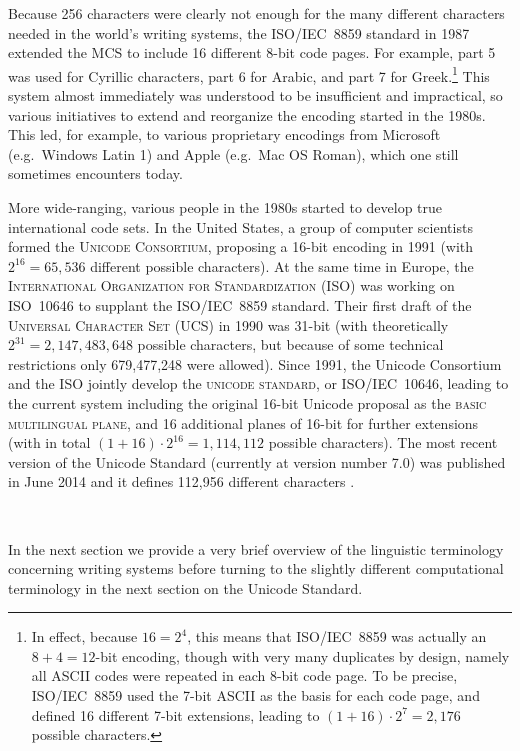 Because 256 characters were clearly not enough for the many different characters
needed in the world's writing systems, the ISO/IEC~8859 standard in 1987
extended the MCS to include 16 different 8-bit code pages. For example, part 5
was used for Cyrillic characters, part 6 for Arabic, and part 7 for
Greek.\footnote{In effect, because $16 = 2^4$, this means that ISO/IEC~8859 was
actually an $8+4=12$-bit encoding, though with very many duplicates by design, namely 
all ASCII codes were repeated in each 8-bit code page. To be precise,
ISO/IEC~8859 used the 7-bit ASCII as the basis for each code page, and defined
16 different 7-bit extensions, leading to $(1+16)\cdot{2^7} = 2,176$ possible
characters.} This system almost immediately was understood to be insufficient and
impractical, so various initiatives to extend and reorganize the encoding
started in the 1980s. This led, for example, to various proprietary encodings
from Microsoft (e.g.~Windows Latin 1) and Apple (e.g.~Mac OS Roman), which one
still sometimes encounters today. 

More wide-ranging, various people in the 1980s started to develop true
international code sets. In the United States, a group of computer scientists
formed the \textsc{Unicode Consortium}, proposing a 16-bit encoding in 1991
(with $2^{16} = 65,536$ different possible characters). At the same time in
Europe, the \textsc{International Organization for Standardization} (ISO) was
working on ISO~10646 to supplant the ISO/IEC~8859 standard. Their first draft of
the \textsc{Universal Character Set} (UCS) in 1990 was 31-bit (with
theoretically $2^{31} = 2,147,483,648$ possible characters, but because of some
technical restrictions only 679,477,248 were allowed). Since 1991, the Unicode
Consortium and the ISO jointly develop the \textsc{unicode standard}, or
ISO/IEC~10646, leading to the current system including the original 16-bit
Unicode proposal as the \textsc{basic multilingual plane}, and 16 additional
planes of 16-bit for further extensions (with in total $(1+16) \cdot 2^{16} =
1,114,112$ possible characters). The most recent version of the Unicode Standard
(currently at version number 7.0) was published in June 2014 and it defines
112,956 different characters \citep{Unicode2014}.

\ 

\noindent In the next section we provide a very brief overview of the linguistic terminology
concerning writing systems before turning to the slightly different
computational terminology in the next section on the Unicode Standard. 

